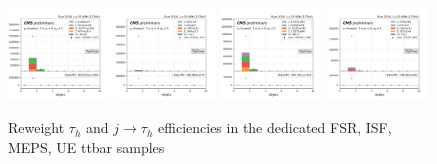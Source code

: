 \begin{figure}
    \includegraphics[width=0.24\textwidth]{chapters/Appendix/sectionQCD/figures/123j1b/mu_nBJets_True.png}
    \includegraphics[width=0.24\textwidth]{chapters/Appendix/sectionQCD/figures/123j1b/mu_nBJets_False.png}
    \includegraphics[width=0.24\textwidth]{chapters/Appendix/sectionQCD/figures/123j1b/e_nBJets_True.png}
    \includegraphics[width=0.24\textwidth]{chapters/Appendix/sectionQCD/figures/123j1b/e_nBJets_False.png}
    

    \caption{Reweight $\tau_h$ and $j \to \tau_h$ efficiencies in the dedicated FSR, ISF, MEPS, UE ttbar samples}
    \label{fig:appendix:123j1b}
\end{figure}


